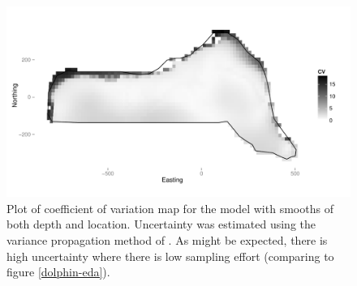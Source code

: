 \documentclass[a4paper,12pt]{article}
\begin{document}
\begin{figure}[h!]
  \caption{Plot of coefficient of variation map for the model with smooths of both depth and location. Uncertainty was estimated using the variance propagation method of \cite{WILLIAMS:2011in}. As might be expected, there is high uncertainty where there is low sampling effort (comparing to figure \ref{dolphin-eda}).}
  \label{cv-plot}
  \begin{center}
    \includegraphics[width=\textwidth]{figs/cvplot-varprop}
  \end{center}
\end{figure}

\newpage
\end{document}
